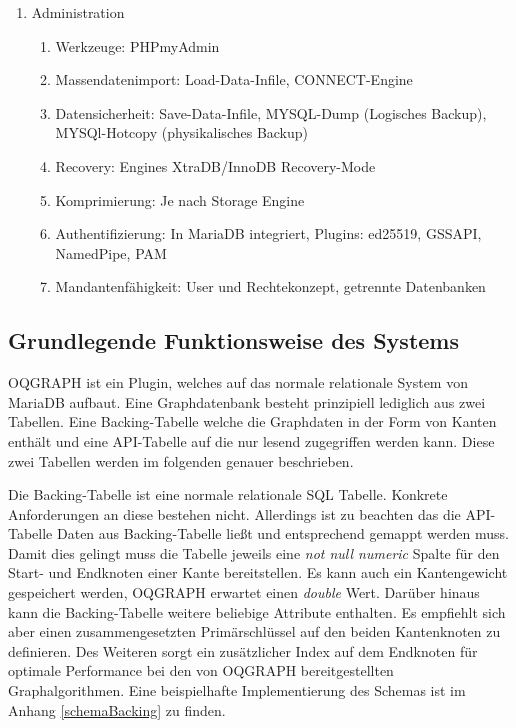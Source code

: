 \begin{enumerate}
\begin{enumerate}
	\end{enumerate}
	\item Administration
	\begin{enumerate}
		\item Werkzeuge: PHPmyAdmin
		\item Massendatenimport: Load-Data-Infile, CONNECT-Engine
		\item Datensicherheit: Save-Data-Infile, MYSQL-Dump (Logisches Backup), MYSQl-Hotcopy (physikalisches Backup)
		\item Recovery: Engines XtraDB/InnoDB Recovery-Mode
		\item Komprimierung: Je nach Storage Engine
		\item Authentifizierung: In MariaDB integriert, Plugins: ed25519, GSSAPI, NamedPipe, PAM
		\item Mandantenfähigkeit: User und Rechtekonzept, getrennte Datenbanken
	\end{enumerate}
\end{enumerate}

\subsection{Grundlegende Funktionsweise des Systems}\label{chp:funktionsweise}
OQGRAPH ist ein Plugin, welches auf das normale relationale System von MariaDB aufbaut. Eine Graphdatenbank besteht prinzipiell lediglich aus zwei Tabellen. Eine Backing-Tabelle welche die Graphdaten in der Form von Kanten enthält und eine API-Tabelle auf die nur lesend zugegriffen werden kann. Diese zwei Tabellen werden im folgenden genauer beschrieben.

Die Backing-Tabelle ist eine normale relationale SQL Tabelle. Konkrete Anforderungen an diese bestehen nicht. Allerdings ist zu beachten das die API-Tabelle Daten aus Backing-Tabelle ließt und entsprechend gemappt werden muss. Damit dies gelingt muss die Tabelle jeweils eine \emph{not null numeric} Spalte für den Start- und Endknoten einer Kante bereitstellen. Es kann auch ein Kantengewicht gespeichert werden, OQGRAPH erwartet einen \emph{double} Wert. Darüber hinaus kann die Backing-Tabelle weitere beliebige Attribute enthalten. Es empfiehlt sich aber einen zusammengesetzten Primärschlüssel auf den beiden Kantenknoten zu definieren. Des Weiteren sorgt ein zusätzlicher Index auf dem Endknoten für optimale Performance bei den von OQGRAPH bereitgestellten Graphalgorithmen. Eine beispielhafte Implementierung des Schemas ist im Anhang \ref{schemaBacking} zu finden.

